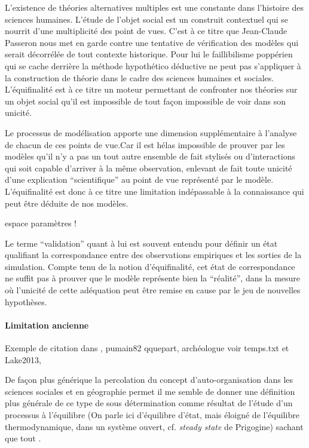 L’existence de théories alternatives multiples est une constante dans l’histoire des sciences humaines. L'étude de l'objet social est un construit contextuel qui se nourrit d'une multiplicité des point de vues. C'est à ce titre que Jean-Claude Passeron \autocite{Passeron2006} nous met en garde contre une tentative de vérification des modèles qui serait décorrélée de tout contexte historique. Pour lui le faillibilisme poppérien qui se cache derrière la méthode hypothético déductive ne peut pas s'appliquer à la construction de théorie dans le cadre des sciences humaines et sociales. L'équifinalité est à ce titre un moteur permettant de confronter nos théories sur un objet social  qu'il est impossible de tout façon impossible de voir dans son unicité.

Le processus de modélisation apporte une dimension supplémentaire à l'analyse de chacun de ces points de vue.Car il est hélas impossible de prouver par les modèles qu'il n'y a pas un tout autre ensemble de fait stylisés ou d'interactions qui soit capable d'arriver à la même observation, enlevant de fait toute unicité d’une explication \enquote{scientifique} au point de vue représenté par le modèle. L'équifinalité est donc à ce titre une limitation indépassable à la connaissance qui peut être déduite de nos modèles.

espace paramètres !

Le terme \enquote{validation} quant à lui est souvent entendu pour définir un état qualifiant la correspondance entre des observations empiriques et les sorties de la simulation. Compte tenu de la notion d'équifinalité, cet état de correspondance ne suffit pas à prouver que le modèle représente bien la \enquote{réalité}, dans la mesure où l’unicité de cette adéquation peut être remise en cause par le jeu de nouvelles hypothèses.

\paragraph{Limitation ancienne}
Exemple de citation dans \textcite[192]{Sheps1971}, pumain82 qquepart, archéologue voir temps.txt et Lake2013,

De façon plus générique la percolation du concept d'auto-organisation dans les sciences sociales et en géographie permet il me semble de donner une définition plus générale de ce type de sous détermination comme résultat de l'étude d'un processus à l'équilibre (On parle ici d'équilibre d'état, mais éloigné de l'équilibre thermodynamique, dans un système ouvert, cf. \textit{steady state} de Prigogine) sachant que tout .

